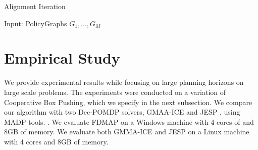 \documentclass[letterpaper]{article} %
\theoremstyle{definition}
\begin{document}
\begin{algorithm}
\caption{Alignment Iteration}
\begin{algorithmic}[tbph]
\State Input: PolicyGraphs $G_1, ..., G_M$
	\EndFor
	\EndIf
	\EndWhile
\EndFor
{}
\end{algorithmic}
\end{algorithm}

\section{Empirical Study}
We provide experimental results while focusing on large planning horizons on large scale problems.
The experiments were conducted on a variation of Cooperative Box Pushing, which we specify in the next subsection.
We compare our algorithm with two Dec-POMDP solvers, GMAA-ICE \cite{GMAAICE} and JESP \cite{JESP}, using MADP-tools. \cite{MADP}.
We evaluate FDMAP on a Windows machine with 4 cores of and 8GB of memory.
We evaluate both GMMA-ICE and JESP on a Linux machine with 4 cores and 8GB of memory.
\end{document}
